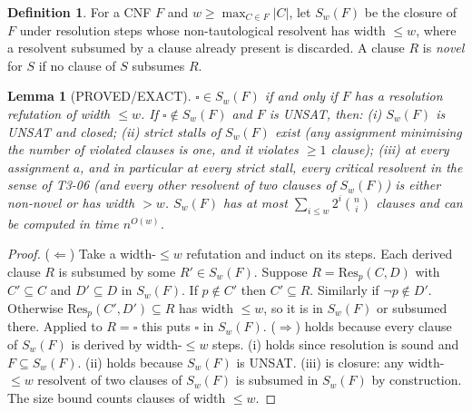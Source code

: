 \documentclass[11pt]{article}
\newtheorem{lemma}[theorem]{Lemma}
\theoremstyle{definition}
\newtheorem{definition}[theorem]{Definition}
\begin{document}
\begin{definition}
For a CNF $F$ and $w\ge \max_{C\in F}|C|$, let $S_w(F)$ be the closure of $F$ under resolution steps whose non-tautological resolvent has width $\le w$, where a resolvent subsumed by a clause already present is discarded. A clause $R$ is \emph{novel} for $S$ if no clause of $S$ subsumes $R$.
\end{definition}

\begin{lemma}[PROVED/EXACT]\label{lem:sat}
$\square\in S_w(F)$ if and only if $F$ has a resolution refutation of width $\le w$. If $\square\notin S_w(F)$ and $F$ is UNSAT, then:
(i) $S_w(F)$ is UNSAT and closed;
(ii) strict stalls of $S_w(F)$ exist (any assignment minimising the number of violated clauses is one, and it violates $\ge1$ clause);
(iii) at \emph{every} assignment $a$, and in particular at every strict stall, every critical resolvent in the sense of T3-06 (and every other resolvent of two clauses of $S_w(F)$) is either non-novel or has width $>w$.
$S_w(F)$ has at most $\sum_{i\le w}2^i\binom{n}{i}$ clauses and can be computed in time $n^{O(w)}$.
\end{lemma}
\begin{proof}
($\Leftarrow$) Take a width-$\le w$ refutation and induct on its steps. Each derived clause $R$ is subsumed by some $R'\in S_w(F)$. Suppose $R=\mathrm{Res}_p(C,D)$ with $C'\subseteq C$ and $D'\subseteq D$ in $S_w(F)$. If $p\notin C'$ then $C'\subseteq R$. Similarly if $\neg p\notin D'$. Otherwise $\mathrm{Res}_p(C',D')\subseteq R$ has width $\le w$, so it is in $S_w(F)$ or subsumed there. Applied to $R=\square$ this puts $\square$ in $S_w(F)$. ($\Rightarrow$) holds because every clause of $S_w(F)$ is derived by width-$\le w$ steps.
(i) holds since resolution is sound and $F\subseteq S_w(F)$. (ii) holds because $S_w(F)$ is UNSAT. (iii) is closure: any width-$\le w$ resolvent of two clauses of $S_w(F)$ is subsumed in $S_w(F)$ by construction. The size bound counts clauses of width $\le w$.
\end{proof}
\end{document}
